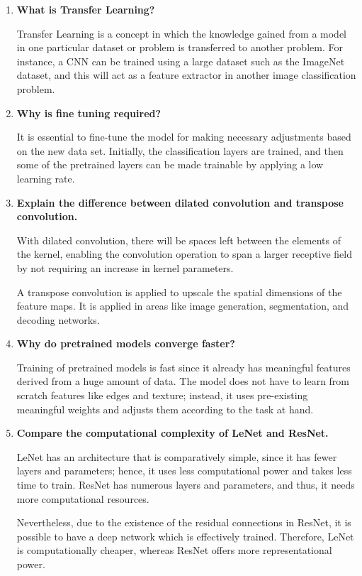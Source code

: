 \documentclass[11pt]{article}
\begin{document}
\begin{enumerate}
ResNet is one of the deep CNNs which utilizes residual blocks with shortcuts. These enable ResNet to build very deep networks without the issues such as vanishing gradients.

\item \textbf{What is Transfer Learning?}

Transfer Learning is a concept in which the knowledge gained from a model in one particular dataset or problem is transferred to another problem. For instance, a CNN can be trained using a large dataset such as the ImageNet dataset, and this will act as a feature extractor in another image classification problem.

\item \textbf{Why is fine tuning required?}

It is essential to fine-tune the model for making necessary adjustments based on the new data set. Initially, the classification layers are trained, and then some of the pretrained layers can be made trainable by applying a low learning rate.

\item \textbf{Explain the difference between dilated convolution and transpose convolution.}

With dilated convolution, there will be spaces left between the elements of the kernel, enabling the convolution operation to span a larger receptive field by not requiring an increase in kernel parameters.

A transpose convolution is applied to upscale the spatial dimensions of the feature maps. It is applied in areas like image generation, segmentation, and decoding networks.

\item \textbf{Why do pretrained models converge faster?}

Training of pretrained models is fast since it already has meaningful features derived from a huge amount of data. The model does not have to learn from scratch features like edges and texture; instead, it uses pre-existing meaningful weights and adjusts them according to the task at hand.

\item \textbf{Compare the computational complexity of LeNet and ResNet.}

LeNet has an architecture that is comparatively simple, since it has fewer layers and parameters; hence, it uses less computational power and takes less time to train. ResNet has numerous layers and parameters, and thus, it needs more computational resources.

Nevertheless, due to the existence of the residual connections in ResNet, it is possible to have a deep network which is effectively trained. Therefore, LeNet is computationally cheaper, whereas ResNet offers more representational power.

\end{enumerate}
\end{document}
